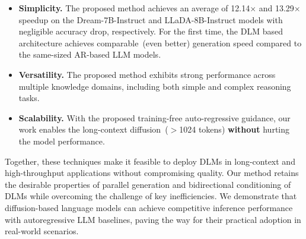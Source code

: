 % 

\begin{itemize}
    \item \textbf{Simplicity.} The proposed method achieves an average of 12.14$\times$ and 13.29$\times$ speedup on the Dream-7B-Instruct and LLaDA-8B-Instruct models with negligible accuracy drop, respectively. 
    For the first time, the DLM based architecture achieves comparable~(even better) generation speed compared to the same-sized AR-based LLM models.
    \item \textbf{Versatility.} The proposed method exhibits strong performance across multiple knowledge domains, including both simple and complex reasoning tasks. 
    \item \textbf{Scalability.} With the proposed training-free auto-regressive guidance, our work enables the long-context diffusion~($>$1024 tokens) \textbf{without} hurting the model performance. 
\end{itemize}








Together, these techniques make it feasible to deploy DLMs in long-context and high-throughput applications without compromising quality. 
Our method retains the desirable properties of parallel generation and bidirectional conditioning of DLMs while overcoming the challenge of key inefficiencies. We demonstrate that diffusion-based language models can achieve competitive inference performance with autoregressive LLM baselines, paving the way for their practical adoption in real-world scenarios.
